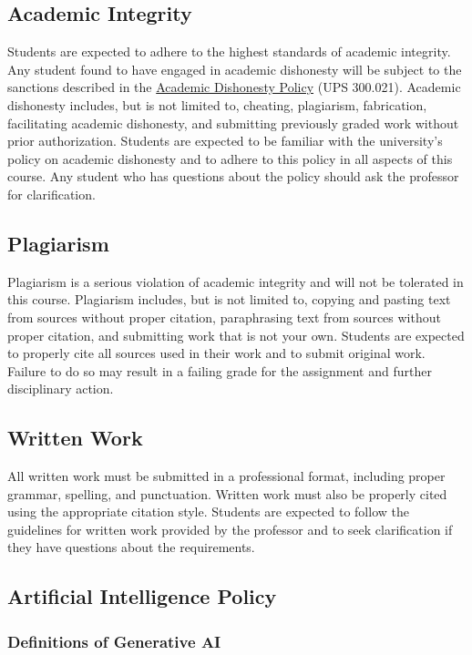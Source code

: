 \documentclass[12pt, letterpaper]{article}
\begin{document}
\subsection*{Academic Integrity}
Students are expected to adhere to the highest standards of academic integrity. Any student found to have engaged in academic dishonesty will be subject to the sanctions described in the \href{https://www.fullerton.edu/senate/publications_policies_resolutions/ups/UPS%20300/UPS%20300.021.pdf}{Academic Dishonesty Policy} (UPS 300.021). Academic dishonesty includes, but is not limited to, cheating, plagiarism, fabrication, facilitating academic dishonesty, and submitting previously graded work without prior authorization. Students are expected to be familiar with the university's policy on academic dishonesty and to adhere to this policy in all aspects of this course. Any student who has questions about the policy should ask the professor for clarification.

\subsection*{Plagiarism}
Plagiarism is a serious violation of academic integrity and will not be tolerated in this course. Plagiarism includes, but is not limited to, copying and pasting text from sources without proper citation, paraphrasing text from sources without proper citation, and submitting work that is not your own. Students are expected to properly cite all sources used in their work and to submit original work. Failure to do so may result in a failing grade for the assignment and further disciplinary action.

\subsection*{Written Work}
All written work must be submitted in a professional format, including proper grammar, spelling, and punctuation. Written work must also be properly cited using the appropriate citation style. Students are expected to follow the guidelines for written work provided by the professor and to seek clarification if they have questions about the requirements.

\subsection*{Artificial Intelligence Policy}
\subsubsection*{Definitions of Generative AI}
\end{document}
